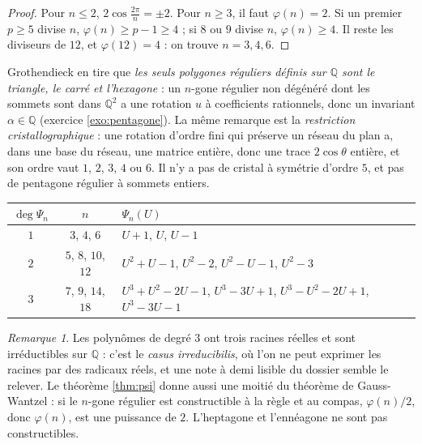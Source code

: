 \documentclass[11pt,a4paper]{article}
\theoremstyle{plain}
\theoremstyle{definition}
\theoremstyle{remark}
\newtheorem{remarque}[theoreme]{Remarque}
\newcommand{\Q}{\mathbb{Q}}
\begin{document}
\begin{proof}
Pour $n\leq2$, $2\cos\frac{2\pi}n=\pm2$. Pour $n\geq3$, il faut $\varphi(n)=2$. Si un premier $p\geq5$ divise $n$, $\varphi(n)\geq p-1\geq4$ ; si $8$ ou $9$ divise $n$, $\varphi(n)\geq4$. Il reste les diviseurs de $12$, et $\varphi(12)=4$ : on trouve $n=3,4,6$.
\end{proof}

Grothendieck en tire que \emph{les seuls polygones réguliers définis sur $\Q$ sont le triangle, le carré et l'hexagone} : un $n$-gone régulier non dégénéré dont les sommets sont dans $\Q^2$ a une rotation $u$ à coefficients rationnels, donc un invariant $\alpha\in\Q$ (exercice \ref{exo:pentagone}). La même remarque est la \emph{restriction cristallographique} : une rotation d'ordre fini qui préserve un réseau du plan a, dans une base du réseau, une matrice entière, donc une trace $2\cos\theta$ entière, et son ordre vaut $1$, $2$, $3$, $4$ ou $6$. Il n'y a pas de cristal à symétrie d'ordre $5$, et pas de pentagone régulier à sommets entiers.

\begin{center}
\renewcommand{\arraystretch}{1.2}
\begin{tabular}{@{}ccl@{}}
\toprule
$\deg\Psi_n$ & $n$ & $\Psi_n(U)$ \\
\midrule
$1$ & $3$, $4$, $6$ & $U+1$, $U$, $U-1$ \\
$2$ & $5$, $8$, $10$, $12$ & $U^2+U-1$, $U^2-2$, $U^2-U-1$, $U^2-3$ \\
$3$ & $7$, $9$, $14$, $18$ & $U^3+U^2-2U-1$, $U^3-3U+1$, $U^3-U^2-2U+1$, $U^3-3U-1$ \\
\bottomrule
\end{tabular}
\end{center}

\begin{remarque}
Les polynômes de degré $3$ ont trois racines réelles et sont irréductibles sur $\Q$ : c'est le \emph{casus irreducibilis}, où l'on ne peut exprimer les racines par des radicaux réels, et une note à demi lisible du dossier semble le relever. Le théorème \ref{thm:psi} donne aussi une moitié du théorème de Gauss-Wantzel : si le $n$-gone régulier est constructible à la règle et au compas, $\varphi(n)/2$, donc $\varphi(n)$, est une puissance de $2$. L'heptagone et l'ennéagone ne sont pas constructibles.
\end{remarque}
\end{document}
